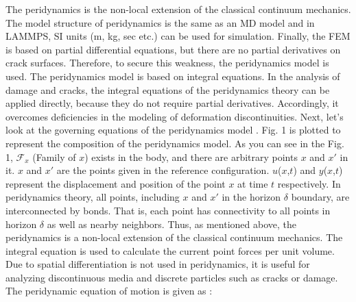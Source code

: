 The peridynamics is the non-local extension of the classical continuum mechanics. The model structure of peridynamics is the same as an MD model and in LAMMPS, SI units (m, kg, sec etc.) can be used for simulation.
{}
Finally, the FEM is based on partial differential equations, but there are no partial derivatives on crack surfaces. Therefore, to secure this weakness, the peridynamics model is used. The peridynamics model is based on integral equations. In the analysis of damage and cracks, the integral equations of the peridynamics theory can be applied directly, because they do not require partial derivatives. Accordingly, it overcomes deficiencies in the modeling of deformation discontinuities. Next, let's look at the governing equations of the peridynamics model \cite{Ref2,Ref3,Ref4}. Fig. 1 is plotted to represent the composition of the peridynamics model. As you can see in the Fig. 1, $\mathcal{F}_x$ (Family of $x$) exists in the body, and there are arbitrary points $x$ and ${x'}$ in it. $x$ and ${x'}$ are the points given in the reference configuration. $u$($x$,$t$) and $y$($x$,$t$) represent the displacement and position of the point $x$ at time $t$ respectively. In peridynamics theory, all points, including $x$ and ${x'}$ in the horizon $\delta$ boundary, are interconnected by bonds. That is, each point has connectivity to all points in horizon $\delta$ as well as nearby neighbors. Thus, as mentioned above, the peridynamics is a non-local extension of the classical continuum mechanics. The integral equation is used to calculate the current point forces per unit volume. Due to spatial differentiation is not used in peridynamics, it is useful for analyzing discontinuous media and discrete particles such as cracks or damage. The peridynamic equation of motion is given as :



